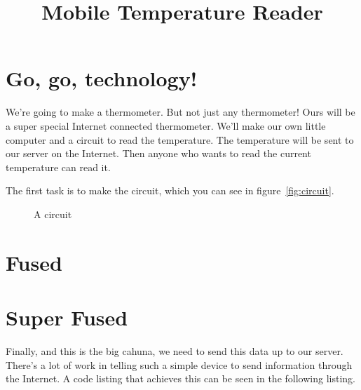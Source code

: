 \documentclass[a5paper]{tufte-book}
\title{Mobile Temperature Reader}
\author{}
\date{}
\begin{document}
\maketitle

\section*{Go, go, technology!}
We're going to make a thermometer.  But not just any thermometer!  Ours will be a super special Internet connected thermometer.  We'll make our own little computer and a circuit to read the temperature.  The temperature will be sent to our server on the Internet.  Then anyone who wants to read the current temperature can read it.

The first task is to make the circuit, which you can see in figure~\ref{fig:circuit}.

\begin{figure}
  \caption{A circuit}
  \label{fig:curcuit}
\end{figure}

\section*{Fused}


\section*{Super Fused}
Finally, and this is the big cahuna, we need to send this data up to our server.  There's a lot of work in telling such a simple device to send information through the Internet.  A code listing that achieves this can be seen in the following listing.
\end{document}
